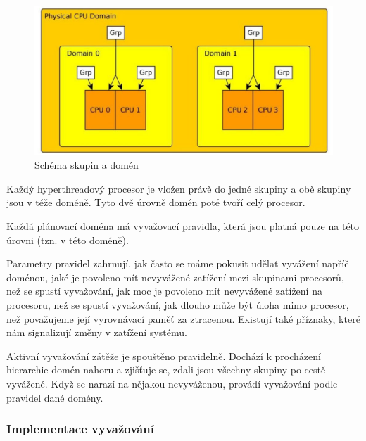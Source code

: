 \documentclass[
  master=true,
  font=sans,
  printversion=false,
  joinlists=true,
  figures=true,
  tables=true,
  sourcecodes=false,
  theorems=false,
  bibencoding=utf8,
  language=czech,
  encoding=utf8,
  field=ainfk,
  biblatex,
  glossaries,
  index
]{kidiplom}
\begin{document}
\begin{figure}[ht]
\includegraphics[scale=0.53]{obrazky/domenyAskupiny.jpeg}
\caption{Schéma skupin a domén}
\label{domeny a skupiny}
\end{figure}

Každý hyperthreadový procesor je vložen právě do jedné skupiny a obě skupiny jsou v téže doméně. Tyto dvě úrovně domén poté tvoří celý procesor. 



Každá plánovací doména má vyvažovací pravidla, která jsou platná pouze na této úrovni (tzn. v této doméně). 

Parametry pravidel zahrnují, jak často se máme pokusit udělat vyvážení napříč doménou, jaké je povoleno mít nevyvážené zatížení mezi skupinami procesorů, než se spustí vyvažování, jak moc je povoleno mít nevyvážené zatížení na procesoru, než se spustí vyvažování, jak dlouho může být úloha mimo procesor, než považujeme její vyrovnávací paměť za ztracenou.
Existují také příznaky, které nám signalizují změny v zatížení systému. 

Aktivní vyvažování zátěže je spouštěno pravidelně. Dochází k procházení hierarchie domén nahoru a zjišťuje se, zdali jsou všechny skupiny po cestě vyvážené. Když se narazí na nějakou nevyváženou, provádí vyvažování podle pravidel dané domény.

\newpage
\subsubsection{Implementace vyvažování}
\end{document}
